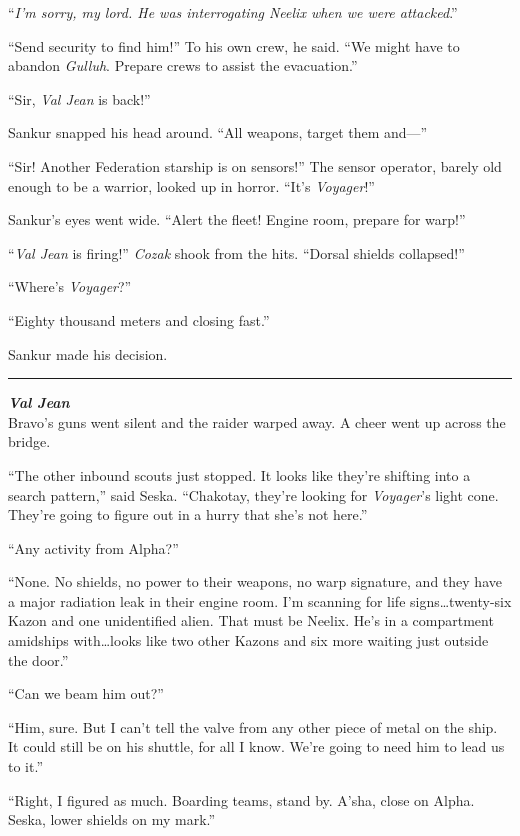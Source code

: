 \documentclass[twoside,letterpaper,12pt]{memoir}
\begin{document}
``\textit{I'm sorry, my lord. He was interrogating Neelix when we were attacked}.''

``Send security to find him!'' To his own crew, he said. ``We might have to abandon \textit{Gulluh}. Prepare crews to assist the evacuation.''

``Sir, \textit{Val Jean} is back!''

Sankur snapped his head around. ``All weapons, target them and---''

``Sir! Another Federation starship is on sensors!'' The sensor operator, barely old enough to be a warrior, looked up in horror. ``It's \textit{Voyager}!''

Sankur's eyes went wide. ``Alert the fleet! Engine room, prepare for warp!''

``\textit{Val Jean} is firing!'' \textit{Cozak} shook from the hits. ``Dorsal shields collapsed!''

``Where's \textit{Voyager}?''

``Eighty thousand meters and closing fast.''

Sankur made his decision.

\fancybreak{\rule{3cm}{0.4 pt}}
\noindent\textit{\textbf{Val Jean}}\\

Bravo’s guns went silent and the raider warped away. A cheer went up across the bridge.

``The other inbound scouts just stopped. It looks like they're shifting into a search pattern,'' said Seska. ``Chakotay, they're looking for \textit{Voyager}'s light cone. They're going to figure out in a hurry that she's not here.'' 

``Any activity from Alpha?''

``None. No shields, no power to their weapons, no warp signature, and they have a major radiation leak in their engine room. I'm scanning for life signs\ldots twenty-six Kazon and one unidentified alien. That must be Neelix. He’s in a compartment amidships with\ldots looks like two other Kazons and six more waiting just outside the door.''

``Can we beam him out?''

``Him, sure. But I can’t tell the valve from any other piece of metal on the ship. It could still be on his shuttle, for all I know. We’re going to need him to lead us to it.''

``Right, I figured as much. Boarding teams, stand by. A'sha, close on Alpha. Seska, lower shields on my mark.''
\end{document}

